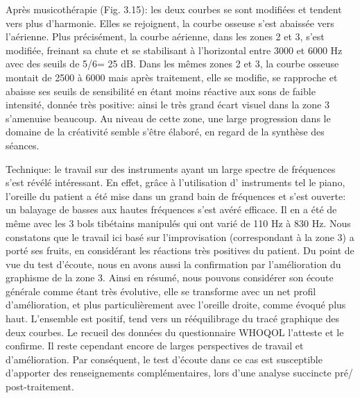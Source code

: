 Après musicothérapie (Fig. 3.15): les deux courbes se sont modifiées et tendent vers plus d'harmonie.
Elles se rejoignent, la courbe osseuse s'est abaissée vers l'aérienne.
 Plus précisément, la courbe aérienne, dans les
zones 2 et 3,  s'est modifiée, freinant sa
chute et se stabilisant à l'horizontal entre 3000 et 6000 Hz
avec des seuils de 5/6= 25 dB.
Dans les mêmes zones 2 et 3, la
courbe osseuse montait de 2500 à 6000 mais après traitement,
elle se modifie, se rapproche et abaisse ses seuils de
sensibilité en étant moins réactive aux sons de faible
intensité, donnée très positive: ainsi le très grand écart visuel dans la zone 3 s'amenuise beaucoup. Au 
niveau de cette
zone, une large progression dans
le domaine de la créativité semble s'être élaboré, en regard de la synthèse des séances. 

 Technique:  le travail sur des instruments ayant un large spectre de fréquences s'est révélé intéressant. 
 En effet, 
 grâce à l'utilisation d' instruments tel le piano,  l'oreille du patient a été mise dans un grand bain de 
 fréquences 
 et  s'est ouverte: un balayage 
 de  basses aux hautes fréquences s'est avéré efficace. Il en a été de même avec les 3 bols tibétains 
 manipulés 
 qui ont varié de 110 Hz à 830 Hz.
 Nous constatons que le travail ici  basé sur l'improvisation (correspondant à la zone 3) a porté ses fruits, 
 en considérant les 
 réactions très positives du patient. 
 Du point de vue du test d'écoute, nous en avons aussi  la confirmation par l'amélioration du  graphisme 
 de la zone 3.
Ainsi en résumé, nous pouvons considérer son écoute générale comme étant très évolutive, elle se 
transforme avec un net profil 
d'amélioration, et 
plus particulièrement avec l'oreille
droite, comme évoqué plus haut. L'ensemble est positif, tend vers un
rééquilibrage du tracé graphique des deux courbes. Le recueil des données du
questionnaire WHOQOL l'atteste et le confirme.
Il reste cependant encore de larges perspectives de travail et d'amélioration.
Par conséquent, le test d'écoute dans ce cas est susceptible d'apporter des renseignements 
complémentaires, lors
d'une analyse succincte pré/ post-traitement.


